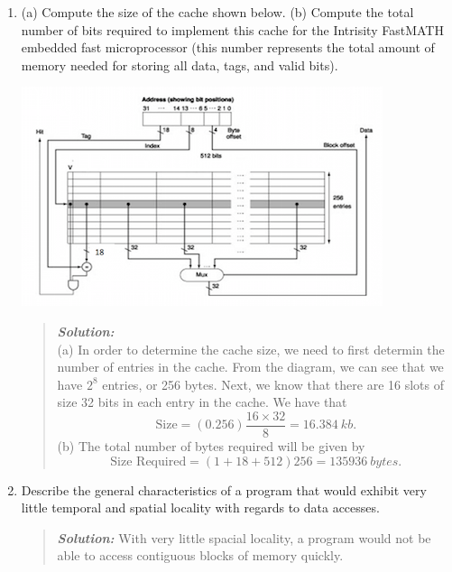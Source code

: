 \documentclass{article}
\newcommand{\SLN}{\textit{\textbf{Solution: }}}
\begin{document}
\begin{enumerate}
\begin{quote}
\indent \SLN In this problem, we need to recompute the AMAT for the new processor and compare it to the result in (2).
The AMAT is again given by
\begin{align*}
\text{AMAT} &= (1.2 \times 2ns) + (0.03 \times 20 \times 2ns)\\
&= 3.6ns.
\end{align*}
This result is less than 4ns, so it is a good trade off.
\end{quote}
\item (a) Compute the size of the cache shown below.
(b) Compute the total number of bits required to implement this cache for the Intrisity FastMATH embedded fast microprocessor 
(this number represents the total amount of memory needed for storing all data, tags, and valid bits).
\begin{center}
\includegraphics[scale=0.7]{hw5_graphic}
\end{center}
\begin{quote}
\indent \SLN\\
\hspace{3cm} (a) In order to determine the cache size, we need to first determin the number of entries in the cache.
From the diagram, we can see that we have $2^{8}$ entries, or 256 bytes.
Next, we know that there are 16 slots of size 32 bits in each entry in the cache.
We have that
\[
\text{Size} = (0.256)\frac{16\times 32}{8} = 16.384\ kb.
\]
(b) The total number of bytes required will be given by
\[
\text{Size Required} = (1 + 18 + 512)256 = 135936\ bytes.
\]
\end{quote}
\item Describe the general characteristics of a program that would exhibit very little temporal 
and spatial locality with regards to data accesses.
\begin{quote}
\indent \SLN With very little spacial locality, a program would not be able to access contiguous blocks of memory quickly.

\end{quote}
\end{enumerate}
\end{document}
